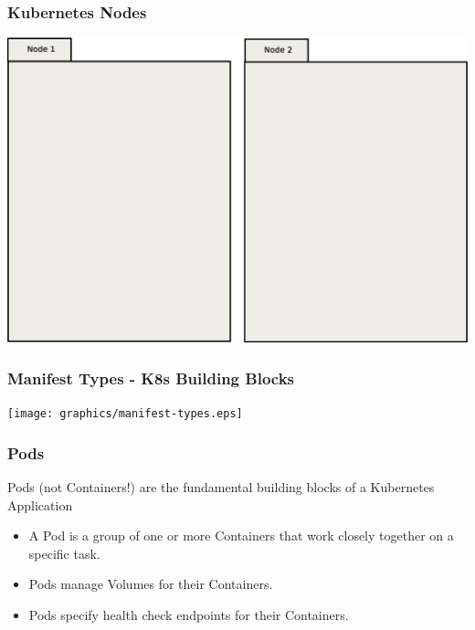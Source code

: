     \begin{frame}
        \frametitle{Kubernetes Nodes}
        \includegraphics[width=\textwidth,height=0.85\textheight,keepaspectratio]{graphics/00-nodes.eps}
    \end{frame}

    \begin{frame}
        \frametitle{Manifest Types - K8s Building Blocks}
        \texttt{[image: graphics/manifest-types.eps]}
    \end{frame}

    \begin{frame}
        \frametitle{Pods}
        Pods (not Containers!) are the fundamental building blocks of a Kubernetes Application\pause
        \begin{itemize}
            \item A Pod is a group of one or more Containers that work closely together on a specific task.\pause
            \item Pods manage Volumes for their Containers.\pause
            \item Pods specify health check endpoints for their Containers.
        \end{itemize}
    \end{frame}

